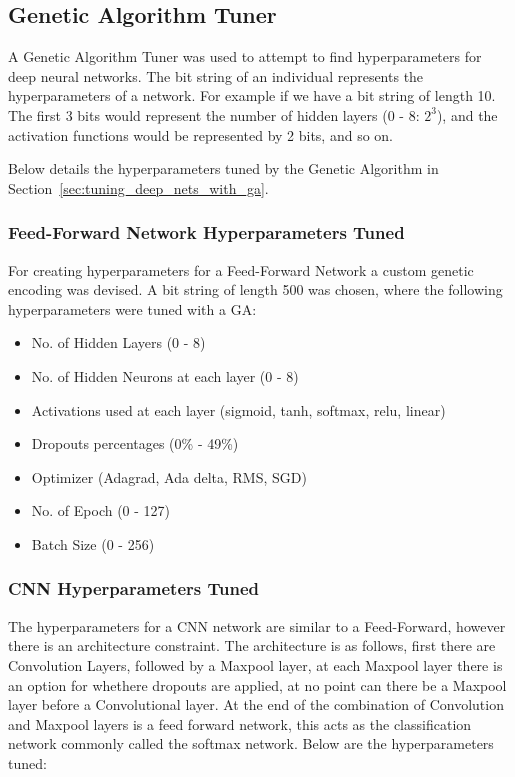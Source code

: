 \subsection{Genetic Algorithm Tuner}
\label{sup:genetic_encoding}
A Genetic Algorithm Tuner was used to attempt to find hyperparameters for deep neural networks. The bit string of an individual represents the hyperparameters of a network. For example if we have a bit string of length 10. The first 3 bits would represent the number of hidden layers (0 - 8: $2^{3}$), and the activation functions would be represented by 2 bits, and so on.

Below details the hyperparameters tuned by the Genetic Algorithm in Section~\ref{sec:tuning_deep_nets_with_ga}.

\subsubsection{Feed-Forward Network Hyperparameters Tuned}
\label{sup:feed_forward_hyperparameters}
For creating hyperparameters for a Feed-Forward Network a custom genetic encoding was devised. A bit string of length 500 was chosen, where the following hyperparameters were tuned with a GA:

\begin{itemize}
	\vspace{-0.5cm}
	\setlength{\itemsep}{0pt}
	\setlength{\parskip}{0pt}
	\setlength{\parsep}{0pt}
	
	\item{No. of Hidden Layers (0 - 8)}
	\item{No. of Hidden Neurons at each layer (0 - 8)}
	\item{Activations used at each layer (sigmoid, tanh, softmax, relu, linear)}
	\item{Dropouts percentages (0\% - 49\%)}
	\item{Optimizer (Adagrad, Ada delta, RMS, SGD)}
	\item{No. of Epoch (0 - 127)}
	\item{Batch Size (0 - 256)}
\end{itemize}


\subsubsection{CNN Hyperparameters Tuned}
\label{sup:cnn_hyperparameters}
The hyperparameters for a CNN network are similar to a Feed-Forward, however there is an architecture constraint. The architecture is as follows, first there are Convolution Layers, followed by a Maxpool layer, at each Maxpool layer there is an option for whethere dropouts are applied, at no point can there be a Maxpool layer before a Convolutional layer. At the end of the combination of Convolution and Maxpool layers is a feed forward network, this acts as the classification network commonly called the softmax network. Below are the hyperparameters tuned:

